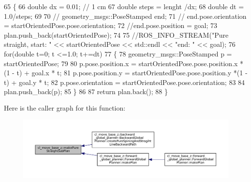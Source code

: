 \begin{DoxyCode}
65     \{
66         \textcolor{keywordtype}{double} dx = 0.01; \textcolor{comment}{// 1 cm}
67         \textcolor{keywordtype}{double} steps = lenght /dx;
68         \textcolor{keywordtype}{double} dt = 1.0/steps;
69 
70         \textcolor{comment}{// geometry\_msgs::PoseStamped end;}
71         \textcolor{comment}{// end.pose.orientation = startOrientedPose.pose.orientation;}
72         \textcolor{comment}{//end.pose.position = goal;}
73         plan.push\_back(startOrientedPose);
74 
75         \textcolor{comment}{//ROS\_INFO\_STREAM("Pure straight, start: " << startOrientedPose << std::endl << "end: " << goal);}
76         \textcolor{keywordflow}{for}(\textcolor{keywordtype}{double} t=0; t <=1.0; t+=dt)
77         \{
78             geometry\_msgs::PoseStamped p = startOrientedPose;
79             
80             p.pose.position.x =  startOrientedPose.pose.position.x *(1 - t) + goal.x * t;
81             p.pose.position.y =  startOrientedPose.pose.position.y *(1 - t) + goal.y * t;
82             p.pose.orientation = startOrientedPose.pose.orientation;
83             
84             plan.push\_back(p);
85         \}
86     
87         \textcolor{keywordflow}{return} plan.back();
88     \}
\end{DoxyCode}
Here is the caller graph for this function\+:
\nopagebreak
\begin{figure}[H]
\begin{center}
\leavevmode
\includegraphics[width=350pt]{namespacecl__move__base__z_a1d6998cc28a1847906272f2bf92bacc8_icgraph}
\end{center}
\end{figure}

